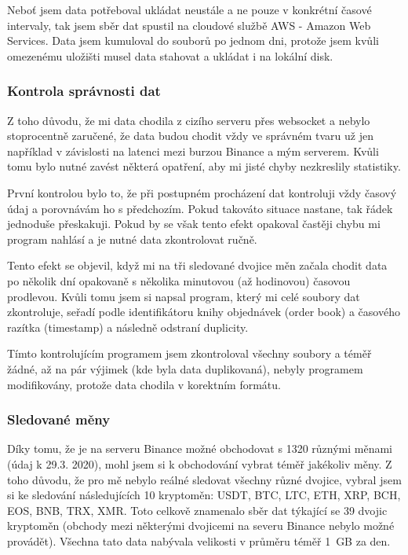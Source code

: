 \documentclass[thesis=B,czech]{FITthesis}[2019/03/21]
\begin{document}
Neboť jsem data potřeboval ukládat neustále a ne pouze v konkrétní časové intervaly, tak jsem sběr dat spustil na cloudové službě AWS - Amazon Web Services. Data jsem kumuloval do souborů po jednom dni, protože jsem kvůli omezenému uložišti musel data stahovat a ukládat i na lokální disk.

\subsubsection{Kontrola správnosti dat}
Z toho důvodu, že mi data chodila z cizího serveru přes websocket a nebylo stoprocentně zaručené, že data budou chodit vždy ve správném tvaru už jen například v závislosti na latenci mezi burzou Binance a mým serverem. Kvůli tomu bylo nutné zavést některá opatření, aby mi jisté chyby nezkreslily statistiky.

První kontrolou bylo to, že při postupném procházení dat kontroluji vždy časový údaj a porovnávám ho s předchozím. Pokud takováto situace nastane, tak řádek jednoduše přeskakuji. Pokud by se však tento efekt opakoval častěji chybu mi program nahlásí a je nutné data zkontrolovat ručně.  

Tento efekt se objevil, když mi na tři sledované dvojice měn začala chodit data po několik dní opakovaně s několika minutovou (až hodinovou) časovou prodlevou. Kvůli tomu jsem si napsal program, který mi celé soubory dat zkontroluje, seřadí podle identifikátoru knihy objednávek (order book) a časového razítka (timestamp) a následně odstraní duplicity. 

Tímto kontrolujícím programem jsem zkontroloval všechny soubory a téměř žádné, až na pár výjimek (kde byla data duplikovaná), nebyly programem modifikovány, protože data chodila v korektním formátu.

\subsubsection{Sledované měny}
Díky tomu, že je na serveru Binance možné obchodovat s 1320 různými měnami (údaj k 29.3. 2020), mohl jsem si k obchodování vybrat téměř jakékoliv měny. Z toho důvodu, že pro mě nebylo reálné sledovat všechny různé dvojice, vybral jsem si ke sledování následujících 10 kryptoměn: USDT, BTC, LTC, ETH, XRP, BCH, EOS, BNB, TRX, XMR. Toto celkově znamenalo sběr dat týkající se 39 dvojic kryptoměn (obchody mezi některými dvojicemi na severu Binance nebylo možné provádět). Všechna tato data nabývala velikosti v průměru téměř 1~GB za den.
\end{document}
